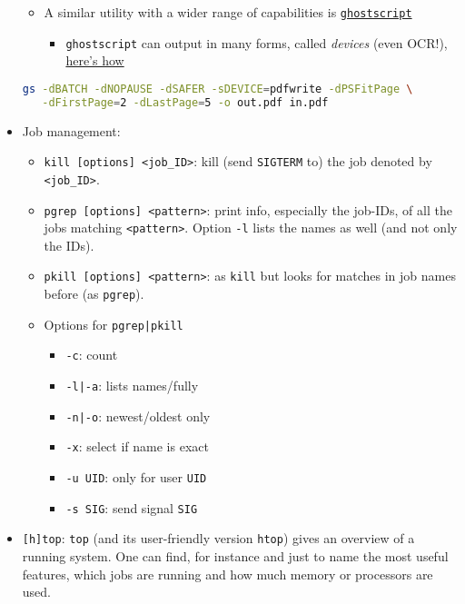 \documentclass[a4paper,12pt,%
              final%
              ]{article}
\begin{document}
\begin{itemize}
\begin{itemize}
      \item A similar utility with a wider range of capabilities is \href{https://www.ghostscript.com/doc/current/Use.htm}{\texttt{ghostscript}}
        \begin{itemize}
          \item \texttt{ghostscript} can output in many forms, called \emph{devices} (even OCR!), \href{https://ghostscript.com/docs/9.54.0/Devices.htm}{here's how}
        \end{itemize}
    \end{itemize}
\begin{lstlisting}[language=bash]
gs -dBATCH -dNOPAUSE -dSAFER -sDEVICE=pdfwrite -dPSFitPage \
   -dFirstPage=2 -dLastPage=5 -o out.pdf in.pdf
\end{lstlisting}
  \item Job management:
    \begin{itemize}
      \item \verb|kill [options] <job_ID>|: kill (send \texttt{SIGTERM} to) the job denoted by \verb|<job_ID>|.
      \item \verb|pgrep [options] <pattern>|: print info, especially the job-IDs, of all the jobs matching \verb|<pattern>|. Option \verb|-l| lists the names as well (and not only the IDs).
      \item \verb|pkill [options] <pattern>|: as \verb|kill| but looks for matches in job names before (as \verb|pgrep|).
      \item Options for \verb!pgrep|pkill!
        \begin{itemize}
          \item \verb|-c|: count
          \item \verb!-l|-a!: lists names/fully
          \item \verb!-n|-o!: newest/oldest only
          \item \verb|-x|: select if name is exact
          \item \verb|-u UID|: only for user \verb|UID|
          \item \verb|-s SIG|: send signal \verb|SIG|
        \end{itemize}
    \end{itemize}
  \item \verb|[h]top|: \verb|top| (and its user-friendly version \verb|htop|) gives an overview of a running system. One can find, for instance and just to name the most useful features, which jobs are running and how much memory or processors are used.
    \begin{itemize}

\end{itemize}
\end{itemize}
\end{document}
